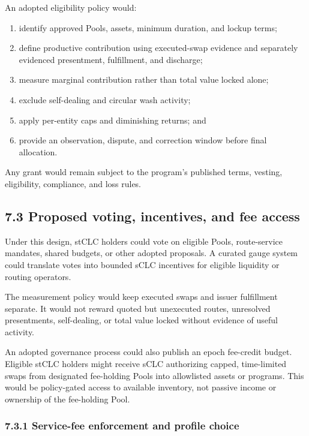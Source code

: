 \documentclass[11pt]{article}
\begin{document}
An adopted eligibility policy would:

\begin{enumerate}[leftmargin=*]
\item identify approved Pools, assets, minimum duration, and lockup terms;
\item define productive contribution using executed-swap evidence and separately evidenced presentment, fulfillment, and discharge;
\item measure marginal contribution rather than total value locked alone;
\item exclude self-dealing and circular wash activity;
\item apply per-entity caps and diminishing returns; and
\item provide an observation, dispute, and correction window before final allocation.
\end{enumerate}
Any grant would remain subject to the program's published terms, vesting, eligibility, compliance, and loss rules.

\subsection*{7.3 Proposed voting, incentives, and fee access}

Under this design, stCLC holders could vote on eligible Pools, route-service mandates, shared budgets, or other adopted proposals. A curated gauge system could translate votes into bounded sCLC incentives for eligible liquidity or routing operators.

The measurement policy would keep executed swaps and issuer fulfillment separate. It would not reward quoted but unexecuted routes, unresolved presentments, self-dealing, or total value locked without evidence of useful activity.

An adopted governance process could also publish an epoch fee-credit budget. Eligible stCLC holders might receive sCLC authorizing capped, time-limited swaps from designated fee-holding Pools into allowlisted assets or programs. This would be policy-gated access to available inventory, not passive income or ownership of the fee-holding Pool.

\subsubsection*{7.3.1 Service-fee enforcement and profile choice}
\end{document}
